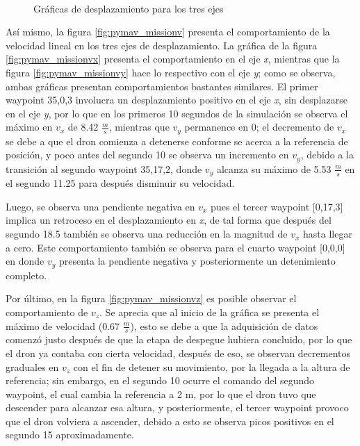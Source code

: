 \begin{figure}[ht]
    \centering
    \hfill
    \\
    \hfill

    \caption{Gráficas de desplazamiento para los tres ejes}
    \label{fig:pymav_missiond}
\end{figure}

 Así mismo, la figura \ref{fig:pymav_missionv} presenta el comportamiento de la velocidad lineal en los tres ejes de desplazamiento. La gráfica de la figura \ref{fig:pymav_missionvx} presenta el comportamiento en el eje \textit{x}, mientras que la figura \ref{fig:pymav_missionvy} hace lo respectivo con el eje \textit{y}; como se observa, ambas gráficas presentan comportamientos bastantes similares. El primer waypoint 35,0,3 involucra un desplazamiento positivo en el eje \textit{x}, sin desplazarse en el eje \textit{y}, por lo que en los primeros 10 segundos de la simulación se observa el máximo en $v_x$ de 8.42 $\frac{m}{s}$, mientras que $v_y$ permanence en 0; el decremento de $v_x$ se debe a que el dron comienza a detenerse conforme se acerca a la referencia de posición, y poco antes del segundo 10 se observa un incremento en $v_y$, debido a la transición al segundo waypoint 35,17,2, donde $v_y$ alcanza su máximo de 5.53 $\frac{m}{s}$ en el segundo 11.25 para después disminuir su velocidad.
 
 Luego, se observa una pendiente negativa en $v_x$ pues el tercer waypoint [0,17,3] implica un retroceso en el desplazamiento en \textit{x}, de tal forma que después del segundo 18.5 también se observa una reducción en la magnitud de $v_x$ hasta llegar a cero. Este comportamiento también se observa para el cuarto waypoint [0,0,0] en donde $v_y$ presenta la pendiente negativa y posteriormente un detenimiento completo.

 Por último, en la figura \ref{fig:pymav_missionvz} es posible observar el comportamiento de $v_z$. Se aprecia que al inicio de la gráfica se presenta el máximo de velocidad (0.67 $\frac{m}{s}$), esto se debe a que la adquisición de datos comenzó justo después de que la etapa de despegue hubiera concluido, por lo que el dron ya contaba con cierta velocidad, después de eso, se observan decrementos graduales en $v_z$ con el fin de detener su movimiento, por la llegada a la altura de referencia; sin embargo, en el segundo 10 ocurre el comando del segundo waypoint, el cual cambia la referencia a 2 m, por lo que el dron tuvo que descender para alcanzar esa altura, y posteriormente, el tercer waypoint provoco que el dron volviera a ascender, debido a esto se observa picos positivos en el segundo 15 aproximadamente. 


